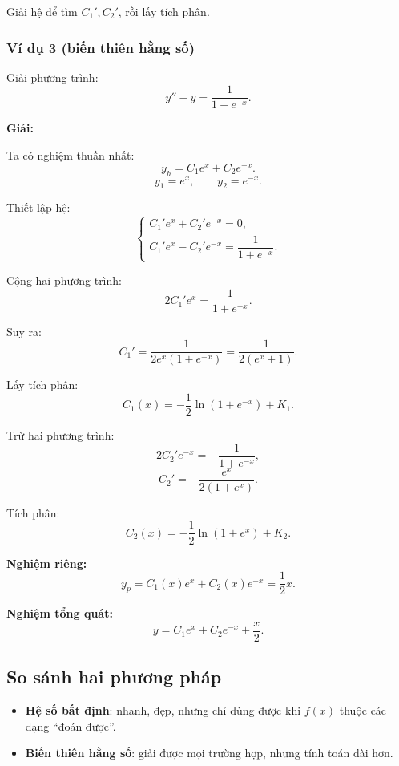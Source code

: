 \documentclass[12pt,a4paper]{article}
\begin{document}
Giải hệ để tìm $C_1', C_2'$, rồi lấy tích phân.

\subsubsection*{Ví dụ 3 (biến thiên hằng số)}
Giải phương trình:
\[
y'' - y = \frac{1}{1+e^{-x}}.
\]

\textbf{Giải:}

Ta có nghiệm thuần nhất:
\[
y_h = C_1 e^x + C_2 e^{-x}.
\]
\[
y_1 = e^x,\qquad y_2 = e^{-x}.
\]

Thiết lập hệ:
\[
\begin{cases}
C_1' e^x + C_2' e^{-x} = 0,\\[6pt]
C_1' e^x - C_2' e^{-x} = \dfrac{1}{1+e^{-x}}.
\end{cases}
\]

Cộng hai phương trình:
\[
2C_1' e^x = \frac{1}{1+e^{-x}}.
\]

Suy ra:
\[
C_1' = \frac{1}{2 e^x (1+e^{-x})}
      = \frac{1}{2(e^x + 1)}.
\]

Lấy tích phân:
\[
C_1(x) = -\frac12 \ln(1+e^{-x}) + K_1.
\]

Trừ hai phương trình:
\[
2C_2' e^{-x} = - \frac{1}{1+e^{-x}},
\]
\[
C_2' = -\frac{e^x}{2(1+e^x)}.
\]

Tích phân:
\[
C_2(x)= -\frac12 \ln(1+e^x) + K_2.
\]

\textbf{Nghiệm riêng:}
\[
y_p = C_1(x)e^x + C_2(x)e^{-x}
= \frac12 x.
\]

\textbf{Nghiệm tổng quát:}
\[
y = C_1 e^x + C_2 e^{-x} + \frac{x}{2}.
\]

\bigskip

\subsection{So sánh hai phương pháp}

\begin{itemize}
    \item \textbf{Hệ số bất định}: nhanh, đẹp, nhưng chỉ dùng được khi $f(x)$ thuộc các dạng “đoán được”.
    \item \textbf{Biến thiên hằng số}: giải được mọi trường hợp, nhưng tính toán dài hơn.
\end{itemize}
\end{document}
